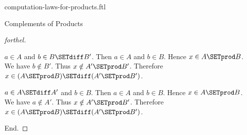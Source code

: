 \documentclass{naproche-library}
\begin{document}
\begin{smodule}[title=Computation Laws for Cartesian Products]{computation-laws-for-products.ftl}
\begin{sfragment}{Complements of Products}
\begin{proof}[forthel]
      \begin{case}{$a \in A$ and $b \in B \SETdiff B'$.}
        Then $a \in A$ and $b \in B$.
        Hence $x \in A \SETprod B$.
        We have $b \notin B'$.
        Thus $x \notin A' \SETprod B'$.
        Therefore $x \in (A \SETprod B) \SETdiff (A' \SETprod B')$.
      \end{case}

      \begin{case}{$a \in A \SETdiff A'$ and $b \in B$.}
        Then $a \in A$ and $b \in B$.
        Hence $x \in A \SETprod B$.
        We have $a \notin A'$.
        Thus $x \notin A' \SETprod B'$.
        Therefore $x \in (A \SETprod B) \SETdiff (A' \SETprod B')$.
      \end{case}
    End.
  \end{proof}
\end{sfragment}
\end{smodule}
\end{document}

